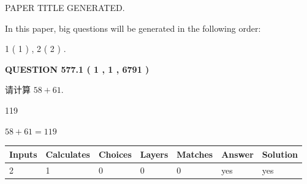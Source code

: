 \documentclass{ctexart}
\begin{document}
   
\vspace{0.2in}
   
   
   
   
   
   
   
   
 \vspace{0.2in}
 
 
 
 
   
   
 PAPER TITLE GENERATED.
   
   
   
\vspace{0.2in}
   
In this paper, big questions will be generated in the following order: 
   
   
   1 ( 1 )
 ,
   2 ( 2 )
 .
  
\vspace{0.2in}
  
{\textbf{\Large{QUESTION
577.1 
 ( 1 , 1 , 6791 )
}}}
  
  
 
请计算 $ %
58 +  %
61 $.
 
 
 
\noindent{}
 
 

119
 
 
\noindent{}
 
 

 
 
 
\noindent{}
 
 

$ %
58 +  %
61=   %
119$
 
 
\noindent{}
 
 

 
   
   
   
   
\noindent\begin{tabular}{|l|l|l|l|l|l|l|}
 \hline
Inputs & Calculates & Choices & Layers & Matches & Answer & Solution \\ \hline
 2  & 
 1  & 
 0
  & 
 0  & 
 0  & 
  yes & 
  yes 
  \\ \hline
 \end{tabular}
   
\end{document}
